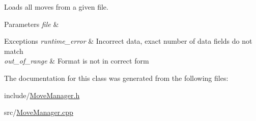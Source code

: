 Loads all moves from a given file. 


\begin{DoxyParams}{Parameters}
{\em file} & \\
\hline
\end{DoxyParams}

\begin{DoxyExceptions}{Exceptions}
{\em runtime\+\_\+error} & Incorrect data, exact number of data fields do not match \\
\hline
{\em out\+\_\+of\+\_\+range} & Format is not in correct form \\
\hline
\end{DoxyExceptions}


The documentation for this class was generated from the following files\+:\begin{DoxyCompactItemize}
\item 
include/\hyperlink{MoveManager_8h}{Move\+Manager.\+h}\item 
src/\hyperlink{MoveManager_8cpp}{Move\+Manager.\+cpp}\end{DoxyCompactItemize}
